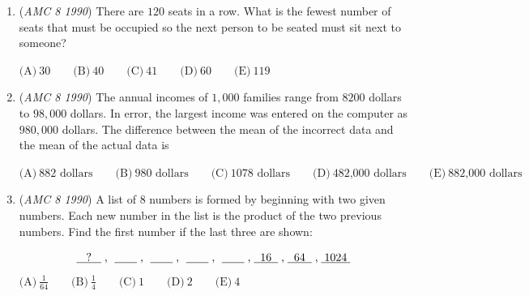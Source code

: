 \begin{enumerate}
$\text{(A)}\ 24 \qquad \text{(B)}\ 30 \qquad \text{(C)}\ 36 \qquad \text{(D)}\ 42 \qquad \text{(E)}\ 48$


	\item (\textit{AMC 8 1990}) There are $120$ seats in a row.  What is the fewest number of seats that must be occupied so the next person to be seated must sit next to someone?


 $\text{(A)}\ 30 \qquad \text{(B)}\ 40 \qquad \text{(C)}\ 41 \qquad \text{(D)}\ 60 \qquad \text{(E)}\ 119$


	\item (\textit{AMC 8 1990}) The annual incomes of $1,000$ families range from $8200$ dollars to $98,000$ dollars.  In error, the largest income was entered on the computer as $980,000$ dollars.  The difference between the mean of the incorrect data and the mean of the actual data is


 $\text{(A)}\ \text{882 dollars} \qquad \text{(B)}\ \text{980 dollars} \qquad \text{(C)}\ \text{1078 dollars} \qquad \text{(D)}\ \text{482,000 dollars} \qquad \text{(E)}\ \text{882,000 dollars}$


	\item (\textit{AMC 8 1990}) A list of $8$ numbers is formed by beginning with two given numbers.  Each new number in the list is the product of the two previous numbers.  Find the first number if the last three are shown:

 \[\text{\underline{\hspace{3 mm}?\hspace{3 mm}}\hspace{1 mm},\hspace{1 mm} \underline{\hspace{7 mm}}\hspace{1 mm},\hspace{1 mm} \underline{\hspace{7 mm}}\hspace{1 mm},\hspace{1 mm} \underline{\hspace{7 mm}}\hspace{1 mm},\hspace{1 mm} \underline{\hspace{7 mm}}\hspace{1 mm},\hspace{1 mm}\underline{\hspace{2 mm}16\hspace{2 mm}}\hspace{1 mm},\hspace{1 mm}\underline{\hspace{2 mm}64\hspace{2 mm}}\hspace{1 mm},\hspace{1 mm}\underline{\hspace{1 mm}1024\hspace{1 mm}}}\]
$\text{(A)}\ \frac{1}{64} \qquad \text{(B)}\ \frac{1}{4} \qquad \text{(C)}\ 1 \qquad \text{(D)}\ 2 \qquad \text{(E)}\ 4$



\end{enumerate}
